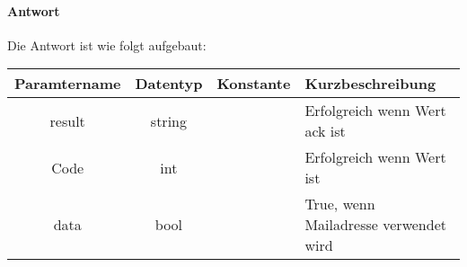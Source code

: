 \paragraph{Antwort}Die Antwort ist wie folgt aufgebaut:
\begin{table}[H]
	\begin{tabular}{|c|c|c|p{6.5cm}|}
		\hline
		\textbf{Paramtername} & \textbf{Datentyp} & \textbf{Konstante} & \textbf{Kurzbeschreibung}                                                                                               \\ \hline
		result              & string           &                 & Erfolgreich wenn Wert {\glqq ack\grqq} ist \\ \hline
		Code                & int              &                 & Erfolgreich wenn Wert {\glqq 0\grqq} ist \\ \hline
		data                & bool             &                 & True, wenn Mailadresse verwendet wird \\ \hline
	\end{tabular}
\end{table}